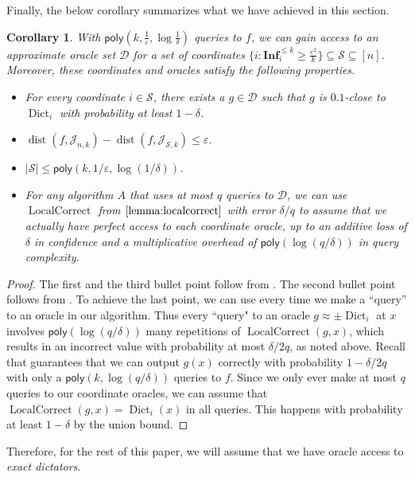 \documentclass[10pt,a4paper]{article}
\providecommand{\poly}{\mathsf{poly}}
\theoremstyle{plain}
\newtheorem{corollary}[theorem]{Corollary}
\theoremstyle{remark}
\theoremstyle{plain}
\newcommand{\LocalCorrect}{\operatorname{LocalCorrect}}
\newcommand\Inf{{\mathbf{Inf}}}
\newcommand{\eps}{\varepsilon}
\newcommand{\calS}{\mathcal{S}}
\newcommand{\Dict}{\operatorname{Dict}}
\newcommand{\dist}{\operatorname{dist}}
\newcommand{\InfluentialCoords}{\calS}
\newcommand{\InfluentialOracles}{\mathcal{D}}
\newcommand{\Juntas}[2]{\mathcal{J}_{#1, #2}}
\renewcommand{\epsilon}{\varepsilon}
\begin{document}
Finally, the below corollary summarizes what we have achieved in this section.
\newcommand{\ideal}{\mathsf{ideal}}

   \begin{corollary}
    \label{corollary:approximate-to-exact-oracles}
    With $\poly(k, \frac{1}{\epsilon}, \log \frac{1}{\delta})$ queries to $f$, we can gain access to an approximate oracle set $\InfluentialOracles$ for a set of coordinates $\{i: \Inf_i^{\leq k}\geq \frac{\eps^2}{k}\} \subseteq \InfluentialCoords \subseteq [n]$. Moreover, these coordinates and oracles satisfy the following properties.  
    \begin{itemize}
        \item For every coordinate $i \in \InfluentialCoords$, there exists a $g \in \InfluentialOracles$ such that $g$ is $0.1$-close to $\Dict_i$ with probability at least $1-\delta$.
        \item $\dist(f, \Juntas{n}{k}) - \dist(f, \Juntas{\InfluentialCoords}{k}) \leq \eps$.
        \item $|\InfluentialCoords| \leq \poly(k,1/\eps, \log (1/\delta))$.
        \item For any algorithm $A$ that uses at most $q$ queries to $\InfluentialOracles$, we can use $\LocalCorrect$ from $\Cref{lemma:localcorrect}$ with error $\delta/q$ to assume that we actually have perfect access to each coordinate oracle, up to an additive loss of $\delta$ in confidence and a multiplicative overhead of $\poly(\log(q/\delta))$ in query complexity.
    \end{itemize}
\end{corollary}
\begin{proof}
The first and the third bullet point follow from . The second bullet point follows from . To achieve the last point, we can use  every time we make a ``query'' to an oracle in our algorithm. Thus every ``query" to an oracle $g\approx \pm \Dict_i$ at $x$ involves $\poly(\log(q/\delta))$ many repetitions of $\LocalCorrect(g,x)$, which results in an incorrect value with probability at most $\delta/2q$, as noted above. Recall that  guarantees that we can output $g(x)$ correctly with probability $1-\delta/2q$ with only a $\poly(k,\log(q/\delta))$ queries to $f$. 
Since we only ever make at most $q$ queries to our coordinate oracles, we can assume that $\LocalCorrect(g,x) =  \Dict_i(x)$ in all queries.
This happens with probability at least $1-\delta$ by the union bound.
\end{proof}
Therefore, for the rest of this paper, we will assume that we have oracle access to \textit{exact dictators}.
\end{document}

